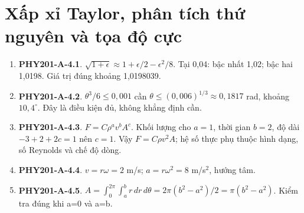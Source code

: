 \documentclass[11pt,a4paper,openany]{book}
\begin{document}
\section{Xấp xỉ Taylor, phân tích thứ nguyên và tọa độ cực}
\begin{enumerate}
\item \textbf{PHY201-A-4.1}. $\sqrt{1+\epsilon}\approx1+\epsilon/2-\epsilon^2/8$. Tại 0,04: bậc nhất 1,02; bậc hai 1,0198. Giá trị đúng khoảng 1,0198039.
\item \textbf{PHY201-A-4.2}. $\theta^3/6\le0{,}001$ cần $\theta\le(0{,}006)^{1/3}\approx0{,}1817$ rad, khoảng $10{,}4^\circ$. Đây là điều kiện đủ, không khẳng định cần.
\item \textbf{PHY201-A-4.3}. $F=C\rho^a v^b A^c$. Khối lượng cho $a=1$, thời gian $b=2$, độ dài $-3+2+2c=1$ nên $c=1$. Vậy $F=C\rho v^2 A$; hệ số thực phụ thuộc hình dạng, số Reynolds và chế độ dòng.
\item \textbf{PHY201-A-4.4}. $v=r\omega=2$ m/s; $a=r\omega^2=8$ m/s$^2$, hướng tâm.
\item \textbf{PHY201-A-4.5}. $A=\int_0^{2\pi}\int_a^b r\,dr\,d\theta=2\pi(b^2-a^2)/2=\pi(b^2-a^2)$. Kiểm tra đúng khi a=0 và a=b.
\end{enumerate}
\end{document}
